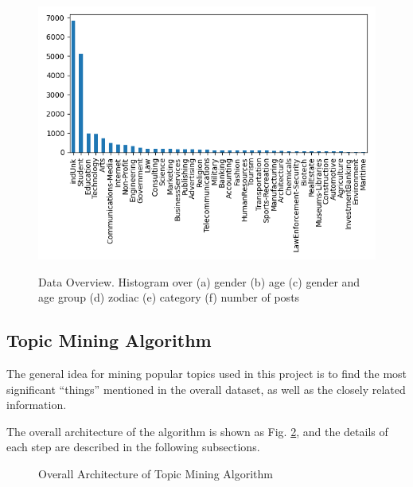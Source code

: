 \documentclass[conference]{IEEEtran}
\begin{document}
\begin{figure}[htbp]
{       \includegraphics[width=0.48\linewidth]{img/show-category.png}}
  \caption{Data Overview. Histogram over (a) gender (b) age (c) gender and age group 
      (d) zodiac (e) category (f) number of posts}
  \label{fig:data-desc}
\end{figure}

\hypertarget{topic-mining-algorithm}{%
\subsection{Topic Mining Algorithm}\label{topic-mining-algorithm}}

The general idea for mining popular topics used in this project is to
find the most significant ``things'' mentioned in the overall dataset,
as well as the closely related information.

The overall architecture of the algorithm is shown as Fig.
\ref{fig:overall}, and the details of each step are described in the
following subsections.

\begin{figure}[htbp]
  \centering
  {
  \fontsize{9}{10}\selectfont
  \def\svgwidth{0.98\textwidth}
    
  }
  \caption{Overall Architecture of Topic Mining Algorithm}
  \label{fig:overall}
\end{figure}
\end{document}
